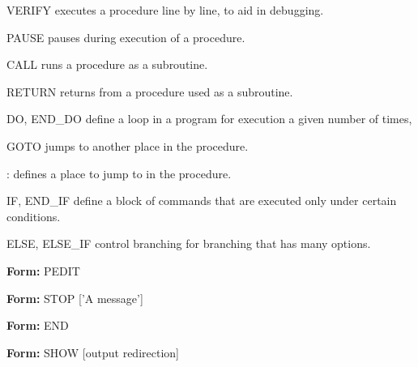 {\newpage\clearpage
{}%
\begin{example}
  \item[VERIFY\hfill]{executes a procedure line by line, to aid in debugging.}
  \item[PAUSE\hfill]{pauses during execution of a procedure.}
  \item[CALL\hfill]{runs a procedure as a subroutine.}
  \item[RETURN\hfill]{returns from a procedure used as a subroutine.}
  \item[DO, END\_DO\hfill]{define a loop in a program for execution a given
       number of times,}
  \item[GOTO\hfill]{jumps to another place in the procedure.}
  \item[:\hfill]{defines a place to jump to in the procedure.}
  \item[IF, END\_IF \hfill]{define a block of commands that are executed
       only under certain conditions.}
  \item[ELSE, ELSE\_IF\hfill]{control branching for branching that has many
       options.}
\end{example}%
\lthtmlfigureZ
\lthtmlcheckvsize\clearpage}

{\newpage\clearpage
{}%
\begin{command}
  \item[\textbf{Form: } PEDIT\hfill]{}
\end{command}%
\lthtmlfigureZ
\lthtmlcheckvsize\clearpage}

{\newpage\clearpage
{}%
\begin{command}
  \item[\textbf{Form: } STOP {['A message']}\hfill]{}
\end{command}%
\lthtmlfigureZ
\lthtmlcheckvsize\clearpage}

{\newpage\clearpage
{}%
\begin{command} 
  \item[\textbf{Form: } END\hfill]{}
\end{command}%
\lthtmlfigureZ
\lthtmlcheckvsize\clearpage}

{\newpage\clearpage
{}%
\begin{command}
  \item[\textbf{Form: } SHOW {[output redirection]}\hfill]{}
\end{command}%
\lthtmlfigureZ
\lthtmlcheckvsize\clearpage}

